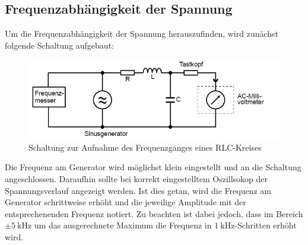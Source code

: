 \subsection{Frequenzabhängigkeit der Spannung\label{FA}}
Um die Frequenzabhängigkeit der Spannung herauszufinden, wird zunächst folgende Schaltung aufgebaut:
\begin{figure}[H]
  \centering
  \includegraphics[width=\textwidth]{Text/Frequenzmesser.jpg}
  \caption{Schaltung zur Aufnahme des Frequenzganges eines RLC-Kreises \cite[295]{sample}}
  \label{fig:Aufbau3}
\end{figure}
Die Frequenz am Generator wird möglichst klein eingestellt und an die Schaltung angeschlossen.
Daraufhin sollte bei korrekt eingestelltem Oszillsokop der Spannungsverlauf angezeigt werden.
Ist dies getan, wird die Frequenz am Generator schrittweise erhöht und die jeweilige
Amplitude mit der entsprechenenden Frequenz notiert.
Zu beachten ist dabei jedoch, dass im Bereich $\pm\SI{5}{\kilo\hertz}$ um das ausgerechnete Maximum
die Frequenz in $\SI{1}{\kilo\hertz}$-Schritten erhöht wird.
